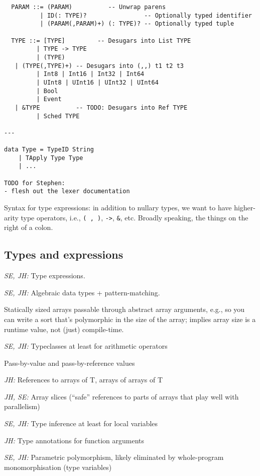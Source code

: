 \documentclass{article}
\begin{document}
\begin{itemize}
\begin{verbatim}
  PARAM ::= (PARAM)          -- Unwrap parens
          | ID(: TYPE)?                -- Optionally typed identifier
          | (PARAM(,PARAM)+) (: TYPE)? -- Optionally typed tuple

  TYPE ::= [TYPE]         -- Desugars into List TYPE
         | TYPE -> TYPE
         | (TYPE)
   | (TYPE(,TYPE)+) -- Desugars into (,,) t1 t2 t3 
         | Int8 | Int16 | Int32 | Int64
         | UInt8 | UInt16 | UInt32 | UInt64
         | Bool
         | Event
   | &TYPE          -- TODO: Desugars into Ref TYPE
         | Sched TYPE

---

data Type = TypeID String
    | TApply Type Type
    | ...

TODO for Stephen:
- flesh out the lexer documentation
\end{verbatim}

\end{itemize}

Syntax for type expressions: in addition to nullary types, we want to have
higher-arity type operators, i.e., \verb|( , )|, \verb|->|, \verb|&|, etc.
Broadly speaking, the things on the right of a colon.

\subsection{Types and expressions}

\textit{SE, JH:} Type expressions.

\textit{SE, JH:} Algebraic data types + pattern-matching.

Statically sized arrays passable through abstract array arguments, e.g., so you
can write a sort that's polymorphic in the size of the array; implies array size
is a runtime value, not (just) compile-time.

\textit{SE, JH:} Typeclasses at least for arithmetic operators

Pass-by-value and pass-by-reference values

\textit{JH:} References to arrays of T, arrays of arrays of T

\textit{JH, SE:} Array slices (``safe'' references to parts of arrays that play
well with parallelism)

\textit{SE, JH:} Type inference at least for local variables

\textit{JH:} Type annotations for function arguments

\textit{SE, JH:} Parametric polymorphism, likely eliminated by whole-program
monomorphisation (type variables)
\end{document}
